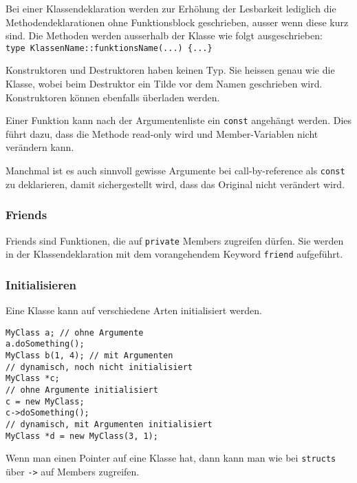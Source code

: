 \documentclass{article}
\newenvironment{code}
	{\begin{shaded}\vspace{-2.2mm}} 
	{\vspace{-5.0mm}\end{shaded}}
\begin{document}
\begin{multicols*}{3}
				Bei einer Klassendeklaration werden zur Erhöhung der Lesbarkeit lediglich die Methodendeklarationen ohne Funktionsblock geschrieben, ausser wenn diese kurz sind.
				Die Methoden werden ausserhalb der Klasse wie folgt ausgeschrieben: \\ \lstinline!type KlassenName::funktionsName(...) {...}!
			
				Konstruktoren und Destruktoren haben keinen Typ. Sie heissen genau wie die Klasse, wobei beim Destruktor ein Tilde vor dem Namen geschrieben wird. Konstruktoren können ebenfalls überladen werden.
				
				Einer Funktion kann nach der Argumentenliste ein \lstinline!const! angehängt werden. Dies führt dazu, dass die Methode read-only wird und Member-Variablen nicht verändern kann.
				
				Manchmal ist es auch sinnvoll gewisse Argumente bei call-by-reference als \lstinline!const! zu deklarieren, damit sichergestellt wird, dass das Original nicht verändert wird.
			
			\subsubsection{Friends} %
				Friends sind Funktionen, die auf \lstinline!private! Members zugreifen dürfen.
				Sie werden in der Klassendeklaration mit dem vorangehendem Keyword \lstinline!friend! aufgeführt.
			
			\subsubsection{Initialisieren} %
				Eine Klasse kann auf verschiedene Arten initialisiert werden.
				\vspace{5mm}
				\begin{code}
					\begin{lstlisting}[style=list]
MyClass a; // ohne Argumente
a.doSomething();
MyClass b(1, 4); // mit Argumenten
// dynamisch, noch nicht initialisiert
MyClass *c;
// ohne Argumente initialisiert
c = new MyClass;
c->doSomething();
// dynamisch, mit Argumenten initialisiert
MyClass *d = new MyClass(3, 1);
					\end{lstlisting}
				\end{code}
				
				Wenn man einen Pointer auf eine Klasse hat, dann kann man wie bei \lstinline!structs! über \lstinline!->! auf Members zugreifen.
		

\end{multicols*}
\end{document}
